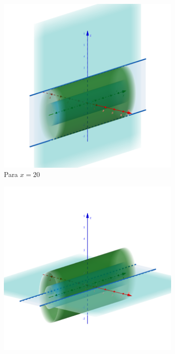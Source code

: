 \documentclass[letterpaper,11pt]{article}
\begin{document}
\begin{enumerate}
\begin{figure}[h!]
\begin{subfigure}{0.3\textwidth}
		\includegraphics[width=\linewidth]{img/2d1_2}
		\caption{Para $ x = 20 $}
	\end{subfigure}
	\begin{subfigure}{0.3\textwidth}
		\includegraphics[width=\linewidth]{img/2d1_3}

\end{subfigure}
\end{figure}
\end{enumerate}
\end{document}
